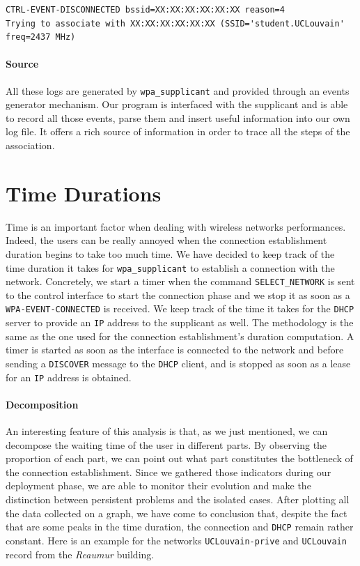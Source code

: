 \begin{lstlisting}[frame=single,breaklines=true,caption={Example of Deconnection trace}]
CTRL-EVENT-DISCONNECTED bssid=XX:XX:XX:XX:XX:XX reason=4
Trying to associate with XX:XX:XX:XX:XX:XX (SSID='student.UCLouvain' freq=2437 MHz)
\end{lstlisting}


\paragraph*{Source} All these logs are generated by \texttt{wpa\_supplicant} and provided through an events generator mechanism. Our program is interfaced with the supplicant and is able to record all those events, parse them and insert useful information into our own log file. It offers a rich source of information in order to trace all the steps of the association.


\section{Time Durations}
Time is an important factor when dealing with wireless networks performances. Indeed, the users can be really annoyed when the connection establishment duration begins to take too much time. We have decided to keep track of the time duration it takes for \texttt{wpa\_supplicant} to establish a connection with the network. Concretely, we start a timer when the command \texttt{SELECT\_NETWORK} is sent to the control interface to start the connection phase and we stop it as soon as a \texttt{WPA-EVENT-CONNECTED} is received. We keep track of the time it takes for the \texttt{DHCP} server to provide an \texttt{IP} address to the supplicant as well. The methodology is the same as the one used for the connection establishment's duration computation. A timer is started as soon as the interface is connected to the network and before sending a \texttt{DISCOVER} message to the \texttt{DHCP} client, and is stopped as soon as a lease for an \texttt{IP} address is obtained. 

\paragraph*{Decomposition} An interesting feature of this analysis is that, as we just mentioned, we can decompose the waiting time of the user in different parts. By observing the proportion of each part, we can point out what part constitutes the bottleneck of the connection establishment. Since we gathered those indicators during our deployment phase, we are able to monitor their evolution and make the distinction between persistent problems and the isolated cases. After plotting all the data collected on a graph, we have come to conclusion that, despite the fact that are some peaks in the time duration, the connection and \texttt{DHCP} remain rather constant. Here is an example for the networks \texttt{UCLouvain-prive} and \texttt{UCLouvain} record from the \emph{Reaumur} building.

